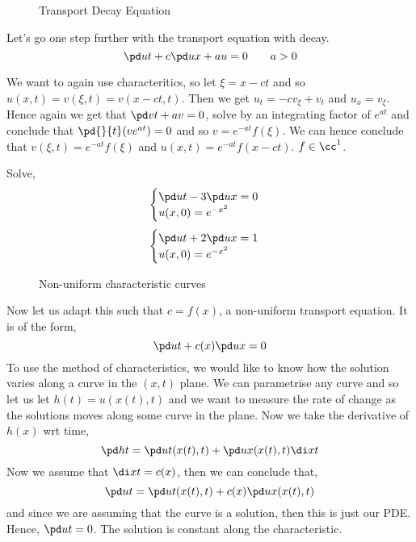 \begin{wrapfigure}{r}{0.5\textwidth}
  \centering
  \resizebox{0.5\textwidth}{!}{}
  \caption{Transport Decay Equation}
\end{wrapfigure}

\noindent
Let's go one step further with the transport equation with decay.
$$ \pd u t + c \pd u x + au = 0 \qquad a > 0 $$
\begin{eg}
  We want to again use characteritics, so let $\xi = x - ct$ and so $u(x, t) = v(\xi, t) = v(x - ct, t)$. Then we get $u_t = -cv_\xi + v_t$ and $u_x = v_\xi$. Hence again we get that $\pd v t + av = 0$, solve by an integrating factor of $e^{at}$ and conclude that $\pd{}{t}(ve^{at}) = 0$ and so $v = e^{-at}f(\xi)$. We can hence conclude that $v(\xi, t) = e^{-at}f(\xi)$ and $u(x, t) = e^{-at}f(x - ct)$. $f \in \cc^1$.
\end{eg}

\begin{exercise}
  Solve,
  $$ \begin{cases}
    \pd u t - 3\pd u x = 0\\
    u(x, 0) = e^{-x^2}
  \end{cases} $$
  $$ \begin{cases}
    \pd u t + 2\pd u x = 1\\
    u(x, 0) = e^{-x^2}
  \end{cases} $$
\end{exercise}

\begin{wrapfigure}{r}{0.5\textwidth}
  \centering
  \resizebox{0.5\textwidth}{!}{}
  \caption{Non-uniform characteristic curves}
\end{wrapfigure}

Now let us adapt this such that $c = f(x)$, a non-uniform transport equation. It is of the form,
$$ \pd u t + c(x)\pd u x = 0 $$
To use the method of characteristics, we would like to know how the solution varies along a curve in the $(x, t)$ plane. We can parametrise any curve and so let us let $h(t) = u(x(t), t)$ and we want to measure the rate of change as the solutions moves along some curve in the plane. Now we take the derivative of $h(x)$ wrt time,
$$ \pd h t = \pd u t (x(t), t) + \pd u x(x(t), t)\di x t $$
Now we assume that $\di x t = c(x)$, then we can conclude that, $$\pd u t = \pd u t (x(t), t) + c(x) \pd u x(x(t), t)$$
and since we are assuming that the curve is a solution, then this is just our PDE. Hence, $\pd u t = 0$. The solution is constant along the characteristic.

